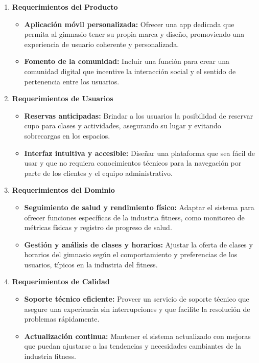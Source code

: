 \begin{enumerate}
\begin{itemize}
    \end{itemize}
    \item \textbf{Requerimientos del Producto}
    \begin{itemize}
        \item \textbf{Aplicación móvil personalizada:} Ofrecer una app dedicada que permita al gimnasio tener su propia marca y diseño, promoviendo una experiencia de usuario coherente y personalizada.
        \item \textbf{Fomento de la comunidad:} Incluir una función para crear una comunidad digital que incentive la interacción social y el sentido de pertenencia entre los usuarios.
    \end{itemize}
    \item \textbf{Requerimientos de Usuarios}
    \begin{itemize}
        \item \textbf{Reservas anticipadas:} Brindar a los usuarios la posibilidad de reservar cupo para clases y actividades, asegurando su lugar y evitando sobrecargas en los espacios.
        \item \textbf{Interfaz intuitiva y accesible:} Diseñar una plataforma que sea fácil de usar y que no requiera conocimientos técnicos para la navegación por parte de los clientes y el equipo administrativo.
    \end{itemize}
    \item \textbf{Requerimientos del Dominio}
    \begin{itemize}
        \item \textbf{Seguimiento de salud y rendimiento físico:} Adaptar el sistema para ofrecer funciones específicas de la industria fitness, como monitoreo de métricas físicas y registro de progreso de salud.
        \item \textbf{Gestión y análisis de clases y horarios:} Ajustar la oferta de clases y horarios del gimnasio según el comportamiento y preferencias de los usuarios, típicos en la industria del fitness.
    \end{itemize}
    \item \textbf{Requerimientos de Calidad}
    \begin{itemize}
        \item \textbf{Soporte técnico eficiente:} Proveer un servicio de soporte técnico que asegure una experiencia sin interrupciones y que facilite la resolución de problemas rápidamente.
        \item \textbf{Actualización continua:} Mantener el sistema actualizado con mejoras que puedan ajustarse a las tendencias y necesidades cambiantes de la industria fitness.

\end{itemize}
\end{enumerate}
